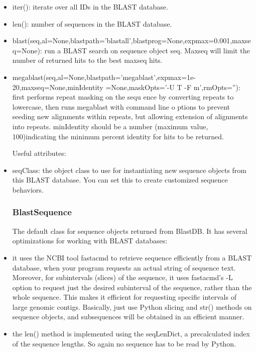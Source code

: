 \documentclass{howto}
\begin{document}
\begin{itemize}

\item
iter(): iterate over all IDs in the BLAST database.

\item
len(): number of sequences in the BLAST database.

\item 
blast(seq,al=None,blastpath='blastall',blastprog=None,expmax=0.001,maxseq=None): run a BLAST search on sequence object seq.  Maxseq will limit the number of returned hits to the best maxseq hits. 
 
\item
megablast(seq,al=None,blastpath='megablast',expmax=1e-20,maxseq=None,minIdentity
=None,maskOpts='-U T -F m',rmOpts=''): first performs repeat masking on the sequ
ence by converting repeats to lowercase, then runs megablast with command line o
ptions to prevent seeding new alignments within repeats, but allowing extension 
of alignments into repeats.  minIdentity should be a number (maximum value, 100)indicating the minimum percent identity for hits to be returned.

Useful attributes:

\item
seqClass: the object class to use for instantiating new sequence objects from this BLAST database.  You can set this to create customized sequence behaviors.

\subsubsection{BlastSequence}

The default class for sequence objects returned from BlastDB.  It has several optimizations for working with BLAST databases:

\item
it uses the NCBI tool fastacmd to retrieve sequence efficiently from a BLAST database, when your program requests an actual string of sequence text.  Moreover, for subintervals (slices) of the sequence, it uses fastacmd's -L option to request just the desired subinterval of the sequence, rather than the whole sequence.  This makes it efficient for requesting specific intervals of large genomic contigs.  Basically, just use Python slicing and str() methods on sequence objects, and subsequences will be obtained in an efficient manner.

\item 
the len() method is implemented using the seqLenDict, a precalculated index of the sequence lengths.  So again no sequence has to be read by Python.

\end{itemize}
\end{document}
